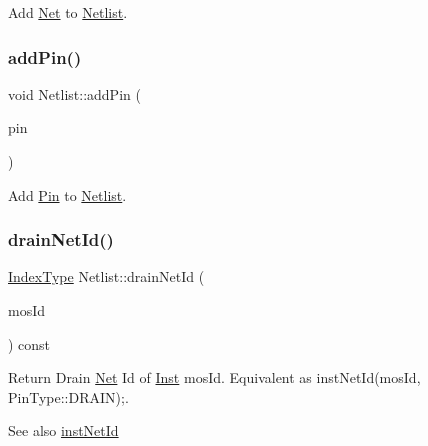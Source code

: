 Add \hyperlink{classNet}{Net} to \hyperlink{classNetlist}{Netlist}. 

\mbox{\label{classNetlist_af0e34bf0cae6f4dd74e4e553c9e7ca1c}} 
\subsubsection{\texorpdfstring{add\+Pin()}{addPin()}}
{\footnotesize\ttfamily void Netlist\+::add\+Pin (\begin{DoxyParamCaption}\item[{\hyperlink{classPin}{Pin} \&}]{pin }\end{DoxyParamCaption})\hspace{0.3cm}{\ttfamily [inline]}}



Add \hyperlink{classPin}{Pin} to \hyperlink{classNetlist}{Netlist}. 

\mbox{\label{classNetlist_aa7a9014b2e827cec0bf76a584c551157}} 
\subsubsection{\texorpdfstring{drain\+Net\+Id()}{drainNetId()}}
{\footnotesize\ttfamily \hyperlink{type_8h_a581e8093e28e7362f2b6937296190676}{Index\+Type} Netlist\+::drain\+Net\+Id (\begin{DoxyParamCaption}\item[{\hyperlink{type_8h_a581e8093e28e7362f2b6937296190676}{Index\+Type}}]{mos\+Id }\end{DoxyParamCaption}) const\hspace{0.3cm}{\ttfamily [inline]}}



Return Drain \hyperlink{classNet}{Net} Id of \hyperlink{classInst}{Inst} mos\+Id. Equivalent as inst\+Net\+Id(mos\+Id, Pin\+Type\+::\+D\+R\+A\+I\+N);. 

\begin{DoxySeeAlso}{See also}
\hyperlink{classNetlist_af7ac6daa5f0f66a60c71b69a1d8fd670}{inst\+Net\+Id} 
\end{DoxySeeAlso}
\mbox{\label{classNetlist_a5efc5375bb3c58e71e068278eadb4764}} 
